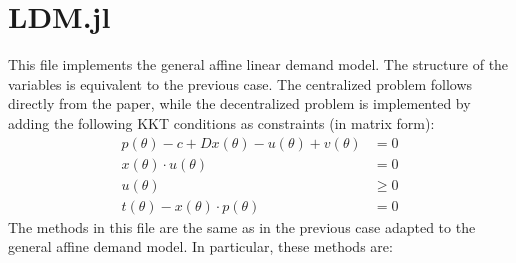 \documentclass[11pt, oneside]{article}
\begin{document}
\section{LDM.jl}
This file implements the general affine linear demand model. The structure of the variables is equivalent to the previous case. The centralized problem
follows directly from the paper, while the decentralized problem is implemented
by adding the following KKT conditions as constraints (in matrix form):
\[
\begin{split}
    p(\theta) - c + Dx(\theta) - u(\theta) + v(\theta) &= 0 \\
    x(\theta)\cdot u(\theta) &= 0 \\
    u(\theta) & \geq 0 \\
    t(\theta) - x(\theta)\cdot p(\theta) &= 0
\end{split}
\]
The methods in this file are the same as in the previous case adapted to the general affine demand model.
In particular, these methods are:
\end{document}
